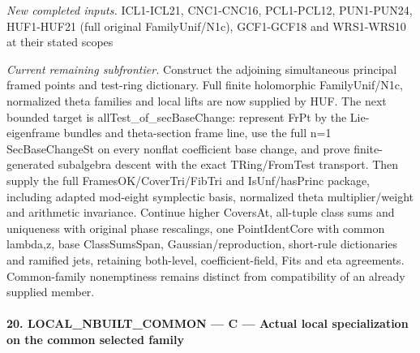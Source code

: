 \emph{New completed inputs.} ICL1-ICL21, CNC1-CNC16, PCL1-PCL12, PUN1-PUN24, HUF1-HUF21 (full original FamilyUnif/N1c), GCF1-GCF18 and WRS1-WRS10 at their stated scopes

\emph{Current remaining subfrontier.} Construct the adjoining simultaneous principal framed points and test-ring dictionary. Full finite holomorphic FamilyUnif/N1c, normalized theta families and local lifts are now supplied by HUF. The next bounded target is allTest\_\allowbreak of\_\allowbreak secBaseChange: represent FrPt by the Lie-eigenframe bundles and theta-section frame line, use the full n=1 SecBaseChangeSt on every nonflat coefficient base change, and prove finite-generated subalgebra descent with the exact TRing/FromTest transport. Then supply the full FramesOK/CoverTri/FibTri and IsUnf/hasPrinc package, including adapted mod-eight symplectic basis, normalized theta multiplier/weight and arithmetic invariance. Continue higher CoversAt, all-tuple class sums and uniqueness with original phase rescalings, one PointIdentCore with common lambda,z, base ClassSumsSpan, Gaussian/reproduction, short-rule dictionaries and ramified jets, retaining both-level, coefficient-field, Fits and eta agreements. Common-family nonemptiness remains distinct from compatibility of an already supplied member.



\paragraph{20. LOCAL\_\allowbreak NBUILT\_\allowbreak COMMON — C — Actual local specialization on the common selected family}

